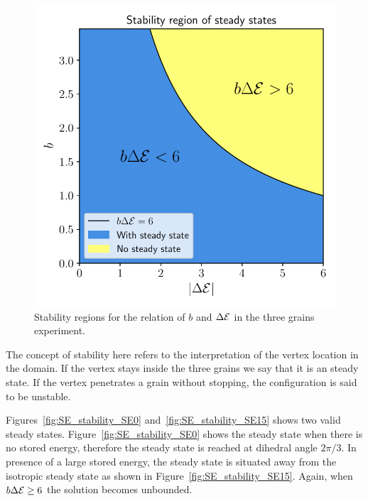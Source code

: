 \begin{figure}[t]
    \centering
    \includegraphics[scale=0.6]{figures/stored_energy/SE_stability.pdf}
    \caption{Stability regions for the relation of $b$ and $\Delta \mathcal{E}$ in the three grains experiment.}
    \label{fig:SE_stability}
\end{figure}

The concept of stability here refers to the interpretation of the vertex location in the domain.
If the vertex stays inside the three grains we say that it is an steady state.
If the vertex penetrates a grain without stopping, the configuration is said to be unstable.

Figures~\ref{fig:SE_stability_SE0} and~\ref{fig:SE_stability_SE15} shows two valid steady states. Figure~\ref{fig:SE_stability_SE0} shows the steady state when there is no stored energy, therefore the steady state is reached at dihedral angle $2\pi/3$. 
In presence of a large stored energy, the steady state is situated away from the isotropic steady state as shown in Figure~\ref{fig:SE_stability_SE15}. 
Again, when $b\Delta \mathcal{E} \geq 6$ the solution becomes unbounded.

